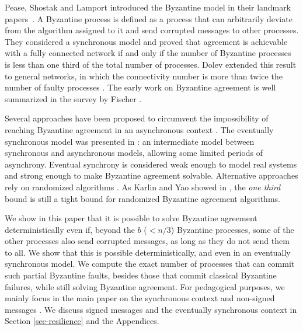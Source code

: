\documentclass[11pt,conference,compsoc,onecolumn,romanappendices]{IEEEtran}
\newcommand{\tmem}[1]{{\em #1\/}}
\begin{document}
Pease, Shostak and Lamport introduced the Byzantine model in
their landmark papers~{\cite{lamport1982byzantine,pease1980reaching}}.
A Byzantine process is defined as a process that can arbitrarily
deviate from the algorithm assigned to it and send corrupted messages to other 
processes.  They considered a synchronous model and proved that agreement is
achievable with a fully connected network if and only if the number of
Byzantine processes is less than one third of the total number of processes.
Dolev extended this result to general networks, in which the connectivity
number is more than twice the number of faulty processes
{\cite{dolev1982byzantine}}. The early work on Byzantine agreement is well
summarized in the survey by Fischer {\cite{fischer1983consensus}}.

Several approaches have been proposed to circumvent the impossibility of reaching
Byzantine agreement in an asynchronous context
{\cite{fischer1985impossibility}}.
The eventually synchronous model was presented in {\cite{dwork1988consensus}}:
an intermediate model between synchronous and asynchronous models, allowing some
limited periods of asynchrony. Eventual synchrony is considered weak enough to
model real systems and strong enough to make Byzantine agreement solvable.
Alternative approaches rely on randomized algorithms
{\cite{braud2013fast,dwork1988fault,king2011load,rabin1983randomized}}. As
Karlin and Yao showed in \cite{karlin1986probabilistic}, the \tmem{one third} bound is still
a tight bound for randomized Byzantine agreement algorithms. 


We show in this paper that it is possible to solve Byzantine agreement deterministically even
if, beyond the $ b$ ($< n/3 $) Byzantine processes,  some of the other  processes
also send corrupted messages, as long as they do not send them to all.  We
show that this is possible deterministically, and even in an eventually
synchronous model.  We compute the exact number of processes that can commit
such partial Byzantine faults, besides those that commit classical Byzantine
failures, while still solving Byzantine agreement.  For pedagogical purposes,
we mainly focus in the main paper on the synchronous context and non-signed messages
\cite{lamport1982byzantine,lincoln1993formally}. We discuss signed messages and the
eventually synchronous context in Section \ref{sec-resilience} and the Appendices.
\end{document}
